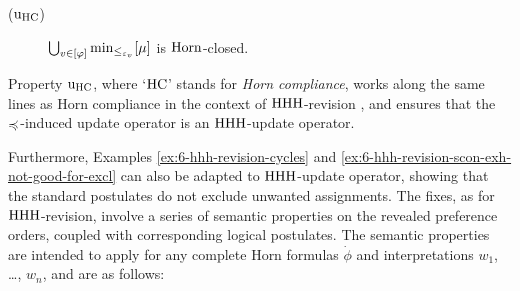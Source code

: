 \begin{description}
	\item[($\mathrm{u}_{\mathrm{HC}}$)] $\bigcup_{v\in[\varphi]}{\operatorname{min}}_{\le_{\varepsilon_{v}}}[\mu]$ is $\mathrm{Horn}$-closed.
\end{description}




Property $\mathrm{u}_{\mathrm{HC}}$, 
where `$\mathrm{HC}$' stands for \emph{Horn compliance},
works along the same lines as Horn compliance 
in the context of ${\mathrm{HHH}}$-revision \cite{DelgrandeP15},
and ensures that the $\preccurlyeq$-induced update operator 
is an ${\mathrm{HHH}}$-update operator.




	

Furthermore, Examples \ref{ex:6-hhh-revision-cycles} and \ref{ex:6-hhh-revision-scon-exh-not-good-for-excl}
can also be adapted to ${\mathrm{HHH}}$-update operator, 
showing that the standard postulates do not exclude unwanted assignments.
The fixes, as for ${\mathrm{HHH}}$-revision, involve 
a series of semantic properties on the revealed preference orders,
coupled with corresponding logical postulates.
The semantic properties are intended to apply for any 
complete Horn formulas $\dot{\phi}$
and interpretations $w_1$, \dots, $w_n$, and are as follows:

